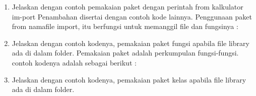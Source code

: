 \begin{enumerate}
\item Jelaskan dengan contoh pemakaian paket dengan perintah from kalkulator im-port Penambahan disertai dengan contoh kode lainnya.
    Penggunaan paket from namafile import, itu berfungsi untuk memanggil file dan fungsinya :
    

\item Jelaskan dengan contoh kodenya, pemakaian paket fungsi apabila file library ada di dalam folder.
    Pemakaian paket adalah perkumpulan fungsi-fungsi. contoh kodenya adalah sebagai berikut :

\item Jelaskan dengan contoh kodenya, pemakaian paket kelas apabila file library ada di dalam folder.
    

\end{enumerate}